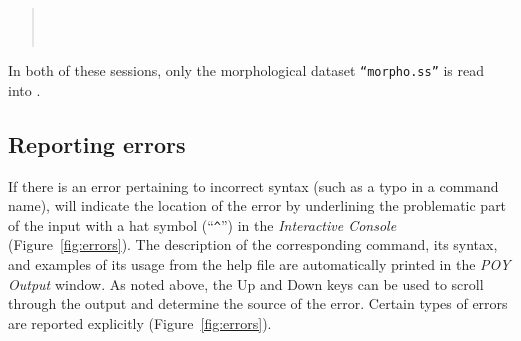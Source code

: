 {\begin{quote}
 	 \\
	 \\
\end{quote}

In both of these sessions, only the morphological dataset \texttt{``morpho.ss''} is read into \poy.

\subsection{Reporting errors}
If there is an error pertaining to incorrect syntax (such as a typo in a command name), \poy will indicate the location 
of the error by underlining the problematic part of the input with a hat symbol (``\texttt{\^}'') in the \emph{Interactive Console} 
(Figure~\ref{fig:errors}). The description of the corresponding command, its syntax, and examples of its usage 
from the help file are automatically printed in the \emph{POY Output} window. As noted above, the Up and Down 
keys can be used to scroll through the output and determine the source of the error. Certain types of errors are reported 
explicitly (Figure~\ref{fig:errors}).

}
